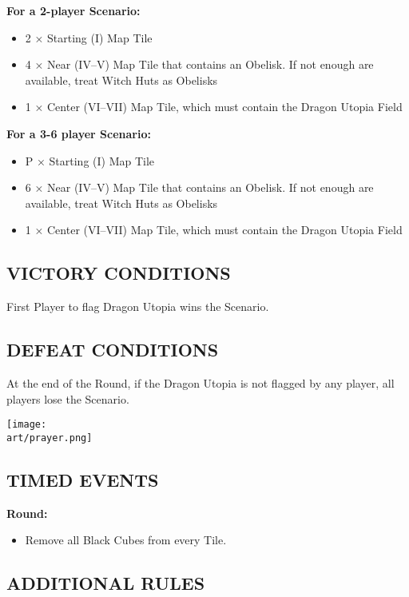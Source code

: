 \begin{multicols}{2}
\textbf{For a 2-player Scenario:}
\begin{itemize}
  \item 2 × Starting (I) Map Tile
  \item 4 × Near (IV--V) Map Tile that contains an Obelisk. If not enough are available, treat Witch Huts as Obelisks
  \item 1 × Center (VI--VII) Map Tile, which must contain the Dragon Utopia Field
\end{itemize}

\textbf{For a 3-6 player Scenario:}
\begin{itemize}
  \item P × Starting (I) Map Tile
  \item 6 × Near (IV--V) Map Tile that contains an Obelisk. If not enough are available, treat Witch Huts as Obelisks
  \item 1 × Center (VI--VII) Map Tile, which must contain the Dragon Utopia Field
\end{itemize}

\subsection*{\MakeUppercase{Victory Conditions}}
First Player to flag Dragon Utopia wins the Scenario.

\subsection*{\MakeUppercase{Defeat Conditions}}
At the end of the  Round, if the Dragon Utopia is not flagged by any player, all players lose the Scenario.

\begin{center}
\texttt{[image: \\art/prayer.png]}
\end{center}

\subsection*{\MakeUppercase{Timed Events}}

\textbf{ Round:}
\begin{itemize}
  \item Remove all Black Cubes from every Tile.
\end{itemize}

\subsection*{\MakeUppercase{Additional Rules}}


\end{multicols}
